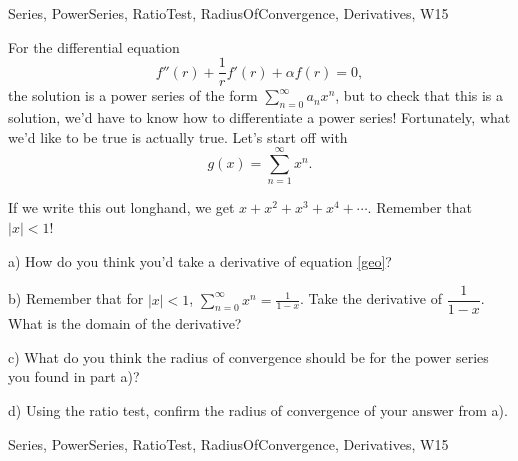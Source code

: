
 

\begin{tagblock}{Series, PowerSeries, RatioTest, RadiusOfConvergence, Derivatives, W15}
\begin{question}

For the differential equation
\begin{equation}\label{series}
f''(r)+\frac 1 rf'(r)+\alpha f(r)=0,
\end{equation}
the solution is a power series of the form $\displaystyle\sum_{n=0}^{\infty}a_nx^n$, but to check that this is a solution, we'd have to know how to differentiate a power series! Fortunately, what we'd like to be true is actually true. Let's start off with 
 \begin{equation}\label{geo}
g(x)=\sum_{n=1}^{\infty}x^n.
\end{equation}

If we write this out longhand, we get $x+x^2+x^3+x^4+\cdots$. Remember that $|x|<1$!

\bigskip

a) How do you think you'd take a derivative of equation \eqref{geo}?

\bigskip

b) Remember that for $|x|<1$, $\displaystyle\sum_{n=0}^{\infty}x^n=\frac 1 {1-x}$. Take the derivative of $\dfrac 1 {1-x}$. What is the domain of the derivative?

\bigskip

c) What do you think the radius of convergence should be for the power series you found in part a)?

\bigskip

d) Using the ratio test, confirm the radius of convergence of your answer from a). 
	
	
\begin{tags}
	    Series, PowerSeries, RatioTest, RadiusOfConvergence, Derivatives, W15
\end{tags}
	
\begin{diary}
	    
\end{diary}
	
\begin{solution}
	   
\end{solution}
	
\end{question}

\end{tagblock}

